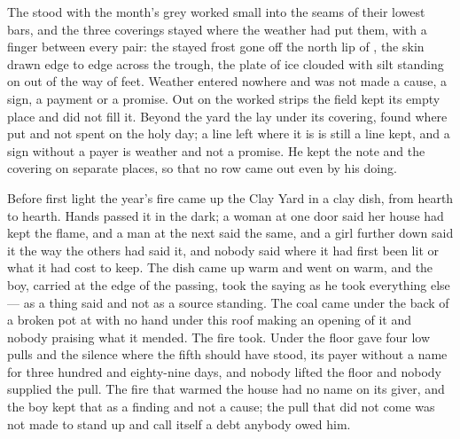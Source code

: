 The  stood with the month's grey worked small into the seams of their lowest bars, and the three coverings stayed where the weather had put them, with a finger between every pair: the stayed frost gone off the north lip of , the skin drawn edge to edge across the trough, the plate of ice clouded with silt standing on  out of the way of feet. Weather entered nowhere and was not made a cause, a sign, a payment or a promise. Out on the worked strips the field kept its empty place and did not fill it. Beyond the yard the  lay under its covering, found where put and not spent on the holy day; a line left where it is is still a line kept, and a sign without a payer is weather and not a promise. He kept the note and the covering on separate places, so that no row came out even by his doing.

Before first light the year's fire came up the Clay Yard in a clay dish, from hearth to hearth. Hands passed it in the dark; a woman at one door said her house had kept the flame, and a man at the next said the same, and a girl further down said it the way the others had said it, and nobody said where it had first been lit or what it had cost to keep. The dish came up warm and went on warm, and the boy, carried at the edge of the passing, took the saying as he took everything else --- as a thing said and not as a source standing. The coal came under the back of a broken pot at  with no hand under this roof making an opening of it and nobody praising what it mended. The fire took. Under the floor  gave four low pulls and the silence where the fifth should have stood, its payer without a name for three hundred and eighty-nine days, and nobody lifted the floor and nobody supplied the pull. The fire that warmed the house had no name on its giver, and the boy kept that as a finding and not a cause; the pull that did not come was not made to stand up and call itself a debt anybody owed him.

